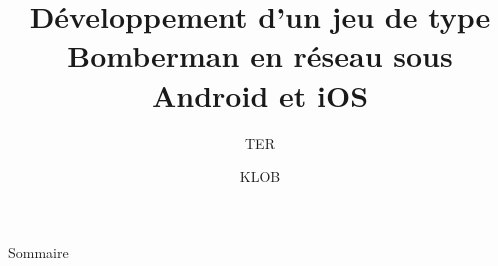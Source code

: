 \documentclass[11pt, sans]{beamer}
\title{Développement d'un jeu de type Bomberman en réseau sous Android et iOS}
\author{KLOB}
\institute{Université Montpellier II}
\subtitle{TER}
\begin{document}
\begin{frame}
\titlepage
\end{frame}


\begin{frame}{Sommaire}
\setcounter{tocdepth}{1}
\tableofcontents
\end{frame}










\end{document}

